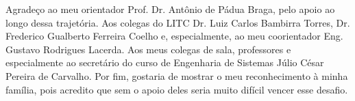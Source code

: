


\begin{agradecimentos}

Agradeço ao meu orientador Prof. Dr. Antônio de Pádua Braga, pelo apoio ao longo dessa trajetória. Aos colegas do LITC Dr. Luiz Carlos Bambirra Torres, Dr. Frederico Gualberto Ferreira Coelho e, especialmente, ao meu coorientador Eng. Gustavo Rodrigues Lacerda. 
Aos meus colegas de sala, professores e especialmente ao secretário do curso de Engenharia de Sistemas Júlio César Pereira de Carvalho. 
Por fim, gostaria de mostrar o meu reconhecimento à minha família, pois acredito que sem o apoio deles seria muito difícil vencer esse desafio.

\end{agradecimentos}
